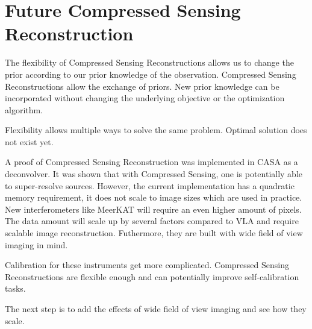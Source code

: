 \section{Future Compressed Sensing Reconstruction}
The flexibility of Compressed Sensing Reconstructions allows us to change the prior according to our prior knowledge of the observation. 
Compressed Sensing Reconstructions allow the exchange of priors. New prior knowledge can be incorporated without changing the underlying objective or the optimization algorithm.

Flexibility allows multiple ways to solve the same problem. Optimal solution does not exist yet. 

A proof of Compressed Sensing Reconstruction was implemented in CASA as a deconvolver. It was shown that with Compressed Sensing, one is potentially able to super-resolve sources. However, the current implementation has a quadratic memory requirement, it does not scale to image sizes which are used in practice. New interferometers like MeerKAT will require an even higher amount of pixels. The data amount will scale up by several factors compared to VLA and require scalable image reconstruction. Futhermore, they are built with wide field of view imaging in mind. 

Calibration for these instruments get more complicated. Compressed Sensing Reconstructions are flexible enough and can potentially improve self-calibration tasks.

The next step is to add the effects of wide field of view imaging and see how they scale.


